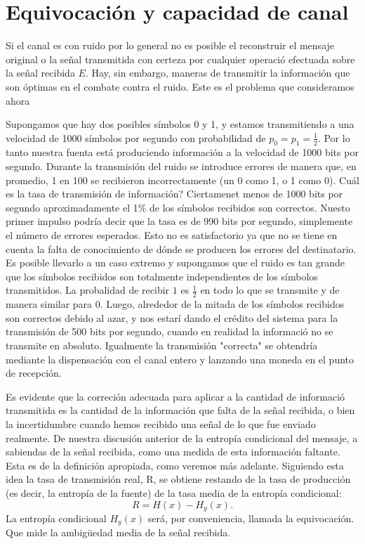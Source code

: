 \clearpage

\chapter{Equivocaci\'{o}n y capacidad de canal}
\label{sec:12}

Si el canal es con ruido por lo general no es posible el reconstruir
el mensaje original o la se\~{n}al transmitida con certeza por
cualquier operaci\'{o} efectuada sobre la se\~{n}al recibida $E$. Hay,
sin embargo, maneras de transmitir la informaci\'{o}n que
son \'{o}ptimas en el combate contra el ruido. Este es el problema que
consideramos ahora

Supongamos que hay dos posibles s\'{i}mbolos 0 y 1, y estamos
transmitiendo a una velocidad de 1000 s\'{i}mbolos por segundo con
probabilidad de $p_{0} = p_{1} = \frac{1}{2}$. Por lo tanto nuestra
fuenta est\'{a} produciendo informaci\'{o}n a la velocidad de 1000
bits por segundo. Durante la transmisi\'{o}n del ruido se introduce
errores de manera que, en promedio, 1 en 100 se recibieron
incorrectamente (un 0 como 1, o 1 como 0). {\textquestiondown}Cu\'{a}l
es la tasa de transmisi\'{o}n de informaci\'{o}n? Ciertamenet menos de
1000 bits por segundo aproximadamente el 1\% de los s\'{i}mbolos
recibidos son correctos. Nuesto primer impulso podr\'{i}a decir que la
tasa es de 990 bits por segundo, simplemente el n\'{u}mero de errores
esperados. Esto no es satisfactorio ya que no se tiene en cuenta la
falta de conocimiento de d\'{o}nde se producen los errores del
destinatario. Es posible llevarlo a un caso extremo y supongamos que
el ruido es tan grande que los s\'{i}mbolos recibidos son totalmente
independientes de los s\'{i}mbolos transmitidos. La probalidad de
recibir $1$ es $\frac{1}{2}$ en todo lo que se transmite y de manera
similar para 0. Luego, alrededor de la mitada de los s\'{i}mbolos
recibidos son correctos debido al azar, y nos estar\'{i} dando el
cr\'{e}dito del sistema para la transmisi\'{o}n de 500 bits por
segundo, cuando en realidad la informaci\'{o} no se transmite en
absoluto. Igualmente la transmisi\'{o}n "correcta" se obtendr\'{i}a
mediante la dispensaci\'{o}n con el canal entero y lanzando una moneda
en el punto de recepci\'{o}n.

Es evidente que la correci\'{o}n adecuada para aplicar a la cantidad
de informaci\'{o} transmitida es la cantidad de la informaci\'{o}n que
falta de la se\~{n}al recibida, o bien la incertidumbre cuando hemos
recibido una se\~{n}al de lo que fue enviado realmente. De nuestra
discusi\'{o}n anterior de la entrop\'{i}a condicional del mensaje, a
sabiendas de la se\~{n}al recibida, como una medida de esta
informaci\'{o}n faltante. Esta es de la definici\'{o}n apropiada, como
veremos m\'{a}s adelante. Siguiendo esta idea la tasa de
transmisi\'{o}n real, R, se obtiene restando de la tasa de
producci\'{o}n (es decir, la entrop\'{i}a de la fuente) de la tasa
media de la entrop\'{i}a condicional:
\begin{equation}
R = H(x)- H_y(x).
\end{equation}
La entrop\'{i}a condicional $H_y(x)$ ser\'{a}, por conveniencia,
llamada la equivocaci\'{o}n. Que mide la ambig\"{u}edad media de la
se\~{n}al recibida.

